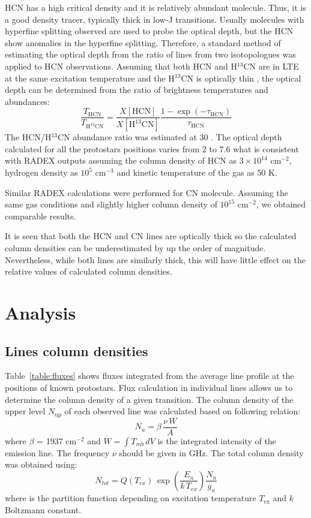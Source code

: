 \documentclass{aa}
\begin{document}
HCN has a high critical density and it is relatively abundant molecule. Thus, it is a good density tracer, typically thick in low-J transitions. Usually molecules with hyperfine splitting observed are used to probe the optical depth, but the HCN show anomalies in the hyperfine splitting. Therefore, a standard method of estimating the optical depth from the ratio of lines from two isotopologues \citep{Gol84} was applied to HCN observations. Assuming that both HCN and H$^{13}$CN are in LTE at the same excitation temperature and the H$^{13}$CN is optically thin \citep{Hog99}, the optical depth can be determined from the ratio of brightness temperatures and abundances:
\begin{equation} \label{eq1}
\frac{T_{\mathrm{HCN}}}{T_{\mathrm{H^{13}CN}}} = \frac{X[\mathrm{HCN}]}{X[\mathrm{H^{13}CN}]} \frac {1-\exp(-\tau_{\mathrm{HCN}})}{\tau_{\mathrm{HCN}}}
\end{equation}
The HCN/H$^{13}$CN abundance ratio was estimated at 30 \citep{Dan13}.
The optical depth calculated for all the protostars positions varies from 2 to 7.6 what is consistent with RADEX outputs assuming the column density of HCN as $3 \times 10^{14}$ cm$^{-2}$, hydrogen density as $10^5$ cm$^{-3}$ and kinetic temperature of the gas as 50 K. 

Similar RADEX calculations were performed for CN molecule. Assuming the same gas conditions and slightly higher column density of $10^{15}$ cm$^{-2}$, we obtained comparable results. 

It is seen that both the HCN and CN lines are optically thick so the calculated column densities can be underestimated by up the order of magnitude. Nevertheless, while both lines are similarly thick, this will have little effect on the relative values of calculated column densities. 

\section{Analysis}

\subsection{Lines column densities}

Table~\ref{table:fluxes} shows fluxes integrated from the average line profile at the positions of known protostars. 
Flux calculation in individual lines allows us to determine the column density of a given transition. The column density of the upper level $N_\mathrm{up}$ of each observed line was calculated based on following relation:
\begin{equation} \label{eq2}
N_u = \beta \, \frac{\nu \, W}{A}
\end{equation}
where $\beta$ = 1937 cm$^{-2}$ and $W = \int{T_{mb} \, dV}$ is the integrated intensity of the emission line. The frequency $\nu$ should be given in GHz. The total column density was obtained using:
\begin{equation} \label{eq3}
N_{tot} = Q(T_{ex}) \, \exp(\frac{E_u }{k \, T_{ex} })  \frac{N_u }{g_u }
\end{equation}
where is the partition function depending on excitation temperature $T_\mathrm{ex}$ and $k$ Boltzmann constant.
\end{document}
